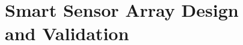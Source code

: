 
\chapter[Smart Sensor Array Design and Validation]{Smart Sensor Array Design\\and Validation}








